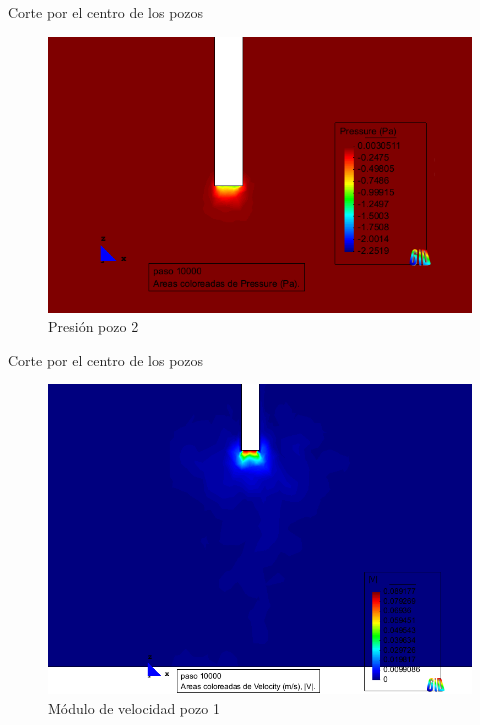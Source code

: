 \documentclass[spanish]{beamer}
\begin{document}
%
\begin{frame}{Corte por el centro de los pozos}
\begin{center}
\begin{figure}[htbp]
\centerline{\includegraphics[scale=0.3]{../img/200m/resul/200_XZ_presion_corte_centro_pozo2}}
\caption{Presión pozo 2}
\end{figure}
\end{center}
\end{frame}
%
\begin{frame}{Corte por el centro de los pozos}
\begin{center}
\begin{figure}[htbp]
\centerline{\includegraphics[scale=0.25]{../img/200m/resul/200_XZ_velocidad_corte_centro_pozo1}}
\caption{Módulo de velocidad pozo 1}
\end{figure}
\end{center}
\end{frame}
\end{document}
